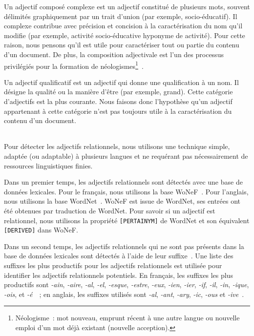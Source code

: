       Un adjectif composé complexe est un adjectif constitué de plusieurs mots,
      souvent délimités graphiquement par un trait d'union (par exemple,
      \og{}socio-éducatif\fg{}). Il complexe contribue avec
      précision et concision à la caractérisation du nom qu'il modifie (par
      exemple, \og{}activité socio-éducative\fg{} hyponyme de
      \og{}activité\fg{}). Pour cette raison, nous pensons qu'il est utile pour
      caractériser tout ou partie du contenu d'un document. De plus, la
      composition adjectivale est l'un des processus privilégiés pour la
      formation de néologismes\footnote{Néologisme~: mot nouveau, emprunt récent
      à une autre langue ou nouvelle emploi d'un mot déjà existant (nouvelle
      acception).}~\cite{boughedaoui1997adjectifscomposes}.

      Un adjectif qualificatif est un adjectif qui donne une qualification à un
      nom. Il désigne la qualité ou la manière d'être (par exemple,
      \og{}grand\fg{}). Cette catégorie d'adjectifs est la plus
      courante. Nous faisons donc l'hypothèse qu'un adjectif appartenant à
      cette catégorie n'est pas toujours utile à la caractérisation du contenu
      d'un document.
      
      ~\\Pour détecter les adjectifs relationnels, nous utilisons une technique
      simple, adaptée (ou adaptable) à plusieurs langues et ne requérant pas
      nécessairement de ressources linguistiques finies.

      Dans un premier temps, les adjectifs relationnels sont détectés avec une
      base de données lexicales. Pour le français, nous utilisons la base
      WoNeF~\cite{pradet2013wonef}. Pour l'anglais, nous
      utilisons la base  WordNet~\cite{miller1995wordnet}. WoNeF est issue de
      WordNet, ses entrées ont été obtenues par traduction de WordNet. Pour
      savoir si un adjectif est relationnel, nous utilisons la propriété
      \texttt{[PERTAINYM]} de WordNet et son équivalent \texttt{[DERIVED]} dans
      WoNeF.

      Dans un second temps, les adjectifs relationnels qui ne sont pas présents
      dans la base de données lexicales sont détectés à l'aide de leur
      suffixe~\cite{dubois1999derivation}. Une liste des suffixes les plus
      productifs pour les adjectifs relationnels est utilisée pour identifier
      les adjectifs relationnels potentiels. En français, les suffixes les plus
      productifs sont \textit{-ain}, \textit{-aire}, \textit{-al}, \textit{-el},
      \textit{-esque}, \textit{-estre}, \textit{-eux}, \textit{-ien},
      \textit{-ier}, \textit{-if}, \textit{-il}, \textit{-in}, \textit{-ique},
      \textit{-ois}, et
      \textit{-é}~\cite{harastani2013relationaladjectivetranslation}~; en
      anglais, les suffixes utilisés sont \textit{-al}, \textit{-ant},
      \textit{-ary}, \textit{-ic}, \textit{-ous} et
      \textit{-ive}~\cite{grabar2006terminologystructuring}.

